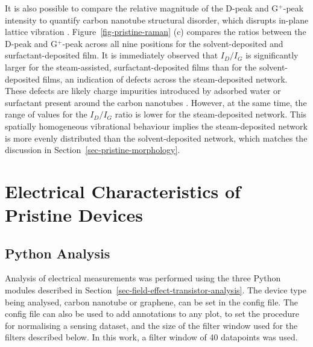 \documentclass[
  a4paper,
]{scrbook}
\begin{document}
It is also possible to compare the relative magnitude of the D-peak and
G\(^+\)-peak intensity to quantify carbon nanotube structural disorder,
which disrupts in-plane lattice vibration
\autocite{Dresselhaus2005,King2014}. Figure~\ref{fig-pristine-raman} (c)
compares the ratios between the D-peak and G\(^+\)-peak across all nine
positions for the solvent-deposited and surfactant-deposited film. It is
immediately observed that \(I_{D}/I_{G}\) is significantly larger for
the steam-assisted, surfactant-deposited films than for the
solvent-deposited films, an indication of defects across the
steam-deposited network. These defects are likely charge impurities
introduced by adsorbed water or surfactant present around the carbon
nanotubes \autocite{Christensen2022}. However, at the same time, the
range of values for the \(I_{D}/I_{G}\) ratio is lower for the
steam-deposited network. This spatially homogeneous vibrational
behaviour implies the steam-deposited network is more evenly distributed
than the solvent-deposited network, which matches the discussion in
Section~\ref{sec-pristine-morphology}.

\hypertarget{sec-pristine-electrical-characterisation}{%
\section{Electrical Characteristics of Pristine
Devices}\label{sec-pristine-electrical-characterisation}}

\hypertarget{sec-python-analysis}{%
\subsection{Python Analysis}\label{sec-python-analysis}}

Analysis of electrical measurements was performed using the three Python
modules described in Section~\ref{sec-field-effect-transistor-analysis}.
The device type being analysed, carbon nanotube or graphene, can be set
in the config file. The config file can also be used to add annotations
to any plot, to set the procedure for normalising a sensing dataset, and
the size of the filter window used for the filters described below. In
this work, a filter window of 40 datapoints was used.
\end{document}
